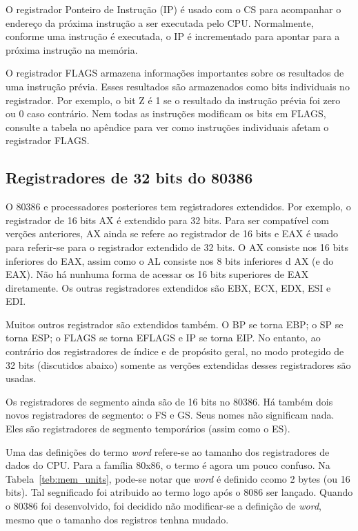 O registrador Ponteiro de Instrução (IP)  é usado com o CS 
para acompanhar o endereço da próxima instrução a ser executada pelo CPU. 
Normalmente, conforme uma instrução é executada, o IP é incrementado para 
apontar para a próxima instrução na memória.

O registrador FLAGS  armazena informações importantes 
sobre os resultados de uma instrução prévia. Esses resultados são armazenados 
como bits individuais no registrador. Por exemplo, o bit Z é 1 se o resultado 
da instrução prévia foi zero ou 0 caso contrário. Nem todas as instruções 
modificam os bits em FLAGS, consulte a tabela no apêndice para ver como 
instruções individuais afetam o registrador FLAGS.

\subsection{Registradores de 32 bits do 80386}

O 80386 e processadores posteriores tem registradores extendidos. Por exemplo, 
o registrador de 16 bits AX é extendido para 32 bits. Para ser compatível 
com verções anteriores, AX ainda se refere ao registrador de 16 bits e EAX é 
usado para referir-se para o registrador extendido de 32 bits. O AX consiste 
nos 16 bits inferiores do EAX, assim como o AL consiste nos 8 bits inferiores 
d AX (e do EAX). Não há nunhuma forma de acessar os 16 bits superiores de EAX 
diretamente. Os outras registradores extendidos são EBX, ECX, EDX, ESI e EDI.

Muitos outros registrador são extendidos também. O BP se torna 
EBP; o SP se torna ESP; o FLAGS se torna EFLAGS e IP se torna 
EIP. No entanto, ao contrário dos registradores de 
índice e de propósito geral, no modo protegido de 32 bits (discutidos abaixo) 
somente as verções extendidas desses registradores são usadas.

Os registradores de segmento ainda são de 16 bits no 80386. Há também dois 
novos registradores de segmento: o FS e GS. Seus nomes 
não significam nada. Eles são registradores de segmento temporários (assim 
como o ES).

Uma das definições do termo \emph{word}  refere-se ao tamanho 
dos registradores de dados do CPU. Para a família 80x86, o termo é agora um 
pouco confuso. Na Tabela~\ref{teb:mem_units}, pode-se notar que \emph{word} é 
definido ccomo 2 bytes (ou 16 bits). Tal segnificado foi atribuido ao termo 
logo após o 8086 ser lançado. Quando o 80386 foi desenvolvido, foi decidido 
não modificar-se a definição de \emph{word}, mesmo que o tamanho dos registros 
tenhna mudado.

